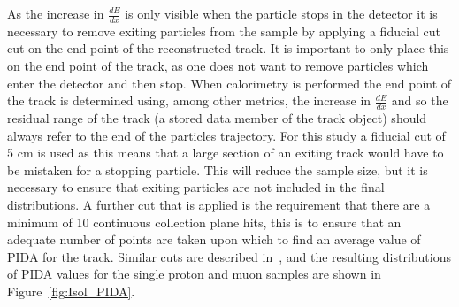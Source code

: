 As the increase in $\frac{dE}{dx}$ is only visible when the particle stops in the detector it is necessary to remove exiting particles from the sample by applying a fiducial cut cut on the end point of the reconstructed track. It is important to only place this on the end point of the track, as one does not want to remove particles which enter the detector and then stop. When calorimetry is performed the end point of the track is determined using, among other metrics, the increase in $\frac{dE}{dx}$ and so the residual range of the track (a stored data member of the track object) should always refer to the end of the particles trajectory. For this study a fiducial cut of 5 cm is used as this means that a large section of an exiting track would have to be mistaken for a stopping particle. This will reduce the sample size, but it is necessary to ensure that exiting particles are not included in the final distributions. A further cut that is applied is the requirement that there are a minimum of 10 continuous collection plane hits, this is to ensure that an adequate number of points are taken upon which to find an average value of PIDA for the track. Similar cuts are described in~\citep{PIDA_Paper}, and the resulting distributions of PIDA values for the single proton and muon samples are shown in Figure~\ref{fig:Isol_PIDA}. \\

